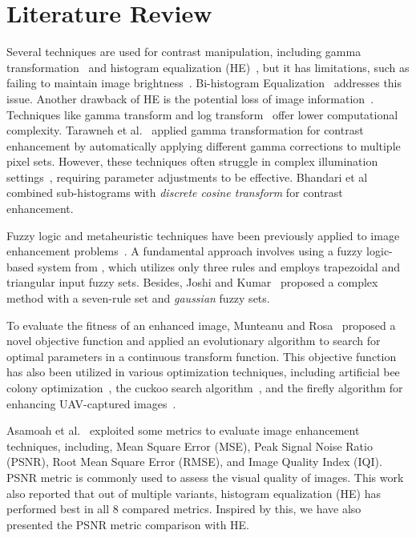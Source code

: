 \section{Literature Review}
\label{section:literature}
Several techniques are used for contrast manipulation, including gamma transformation~\cite{singh2014various} and histogram equalization (HE)~\cite{singh2015histogram,stark2000adaptive}, but it has limitations, such as failing to maintain image brightness~\cite{shanmugavadivu2014particle}. Bi-histogram Equalization~\cite{ooi2009bi} addresses this issue. Another drawback of HE is the potential loss of image information~\cite{zhu2012adaptive}. Techniques like gamma transform and log transform~\cite{singh2014various} offer lower computational complexity. Tarawneh et al.~\cite{tarawneh2020automatic} applied gamma transformation for contrast enhancement by automatically applying different gamma corrections to multiple pixel sets. However, these techniques often struggle in complex illumination settings~\cite{oloyede2019new}, requiring parameter adjustments to be effective.
Bhandari et al~\cite{bhandari2019novel} combined sub-histograms with {\em discrete cosine transform} for contrast enhancement.

Fuzzy logic and metaheuristic techniques have been previously applied to image enhancement problems~\cite{korytkowski2020efficient,fuzzy_plus_meta,diaz2017new}. A fundamental approach involves using a fuzzy logic-based system from \cite{gonzalez2008digital}, which utilizes only three rules and employs trapezoidal and triangular input fuzzy sets. Besides, Joshi and Kumar~\cite{s2018image} proposed a complex method with a seven-rule set and {\em gaussian} fuzzy sets.

To evaluate the fitness of an enhanced image, Munteanu and Rosa~\cite{munteanu2004gray} proposed a novel objective function and applied an evolutionary algorithm to search for optimal parameters in a continuous transform function. This objective function has also been utilized in various optimization techniques, including artificial bee colony optimization~\cite{draa2014artificial}, the cuckoo search algorithm~\cite{bhandari2020cuckoo}, and the firefly algorithm for enhancing UAV-captured images~\cite{samanta2018log}.

Asamoah et al.~\cite{asamoah2018measuring} exploited some metrics to evaluate image enhancement techniques, including, Mean Square Error (MSE), Peak Signal Noise Ratio (PSNR), Root Mean Square Error (RMSE), and Image Quality Index (IQI). PSNR metric is commonly used to assess the visual quality of images. This work also reported that out of multiple variants, histogram equalization (HE) has performed best in all 8 compared metrics. Inspired by this, we have also presented the PSNR metric comparison with HE. 

